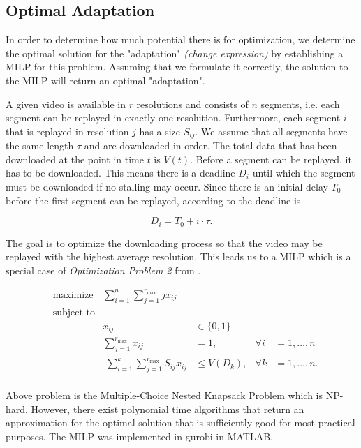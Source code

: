 \subsection{Optimal Adaptation}
\label{optadapt}

In order to determine how much potential there is for optimization, we determine the optimal solution for the "adaptation" \textit{(change expression)} by establishing a MILP for this problem. Assuming that we formulate it correctly, the solution to the MILP will return an optimal "adaptation".

A given video is available in $r$ resolutions and consists of $n$ segments, i.e. each segment can be replayed in exactly one resolution. Furthermore, each segment $i$ that is replayed in resolution $j$ has a size $S_{ij}$. We assume that all segments have the same length $\tau$ and are downloaded in order. The total data that has been downloaded at the point in time $t$ is $V(t)$. Before a segment can be replayed, it has to be downloaded. This means there is a deadline $D_i$ until which the segment must be downloaded if no stalling may occur. Since there is an initial delay $T_0$ before the first segment can be replayed, according to \cite{hossfeld2015identifying} the deadline is

\begin{equation}
D_i = T_0 + i\cdot \tau.
\end{equation}

The goal is to optimize the downloading process so that the video may be replayed with the highest average resolution. This leads us to a MILP which is a special case of \textit{Optimization Problem 2} from \cite{hossfeld2015identifying}.

\begin{align*}
& \text{maximize} & \sum_{i = 1}^{n} \sum_{j = 1}^{r_{\text{max}}} j x_{ij} &\\
& \text{subject to} & &&\\
&& x_{ij} &\in \{0,1\} &\\
&& \sum_{j = 1}^{r_{\text{max}}} x_{ij} &= 1, &\forall i&=1,\ldots,n \\
&& \phantom{\text{.}} \sum_{i=1}^{k} \sum_{j = 1}^{r_{\text{max}}} S_{ij} x_{ij} &\leq V(D_k), &\forall k&=1,\ldots,n \text{.} \\
\end{align*}

Above problem is the Multiple-Choice Nested Knapsack Problem which is NP-hard. However, there exist polynomial time algorithms that return an approximation for the optimal solution that is sufficiently good for most practical purposes. The MILP was implemented in gurobi in MATLAB.
